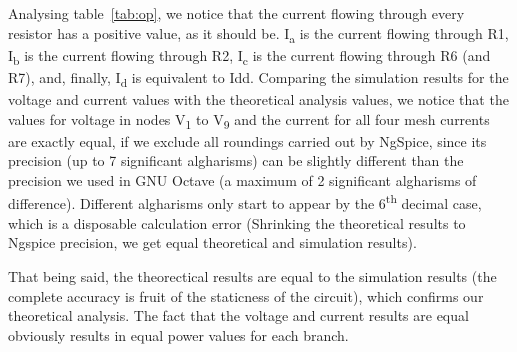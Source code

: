 Analysing table~\ref{tab:op}, we notice that the current flowing through every resistor has a positive value, as it should be. I\textsubscript{a} is the current flowing through R1, I\textsubscript{b} is the current flowing through R2, I\textsubscript{c} is the current flowing through R6 (and R7), and, finally, I\textsubscript{d} is equivalent to Idd.
Comparing the simulation results for the voltage and current values with the theoretical analysis values, we notice that the values for voltage in nodes V\textsubscript{1} to V\textsubscript{9} and the current for all four mesh currents are exactly equal, if we exclude all roundings carried out by NgSpice, since its precision (up to 7 significant algharisms) can be slightly different than the precision we used in GNU Octave (a maximum of 2 significant algharisms of difference). Different algharisms only start to appear by the 6\textsuperscript{th} decimal case, which is a disposable calculation error (Shrinking the theoretical results to Ngspice precision, we get equal theoretical and simulation results).

That being said, the theorectical results are equal to the simulation results (the complete accuracy is fruit of the staticness of the circuit), which confirms our theoretical analysis. The fact that the voltage and current results are equal obviously results in equal power values for each branch.

